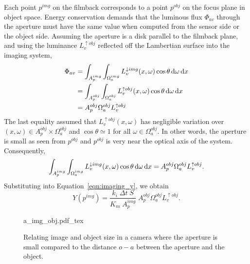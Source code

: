 Each point $p^{img}$ on the filmback corresponds to a point $p^{obj}$ on the
focus plane in object space. Energy conservation demands that the luminous flux
$\Phi_{av}$ through the aperture must have the same value when computed from the
sensor side or the object side. Assuming the aperture is a disk parallel to 
the filmback plane, and using the luminance $L_v^{\uparrow obj}$ reflected off
the Lambertian surface into the imaging system,
\begin{equation}\label{eqn:imaging_energyconservation}
    \begin{split}
    \Phi_{av} &= \int_{A_p^{img}} \int_{\Omega_a^{img}} L_v^{\downarrow img}(x,\omega) \cos\theta \mathop{}\!\mathrm{d}\omega \mathop{}\!\mathrm{d} x \\
              &= \int_{A_p^{obj}} \int_{\Omega_a^{obj}} L_v^{\uparrow obj}(x,\omega) \cos\theta \mathop{}\!\mathrm{d}\omega \mathop{}\!\mathrm{d} x  \\
              &= A_p^{obj} \Omega_a^{obj} L_v^{\uparrow obj} 
    \end{split}
\end{equation}
The last equality assumed that $L_v^{\uparrow obj}(x,\omega)$ has
negligible variation over $(x,\omega)\in A_p^{obj}\times\Omega^{obj}_a$
and $\cos\theta \simeq 1$ for all $\omega\in\Omega^{obj}_a$. 
In other words, the aperture is small as seen from $p^{obj}$
and $p^{obj}$ is very near the optical axis of the system. 
Consequently,
\begin{equation}
    \int_{A_p^{img}} \int_{\Omega_a^{img}} L_v^{\downarrow img}(x,\omega) \cos\theta \mathop{}\!\mathrm{d}\omega \mathop{}\!\mathrm{d} x 
     = A_p^{obj} \Omega_a^{obj}L_v^{\uparrow obj}.
\end{equation}
Substituting into Equation~\eqref{eqn:imaging_y}, we obtain
\begin{equation}\label{eqn:pixel_value_area_solidangle}
  Y(p^{img}) = \frac{k_i\; \Delta t \; S}{K_m\;A^{img}_p} \; A_p^{obj} \Omega_a^{obj}L_v^{\uparrow obj}.
\end{equation}

\begin{figure}[t]
    \centering
    \def\svgwidth{0.9\linewidth}
    {a_img_obj.pdf_tex} 
    \caption{\label{fig:aperture_distance}%
        Relating image and object size in a camera where the aperture is small compared to the distance
        $o-a$ between the aperture and the object.}
\end{figure}

